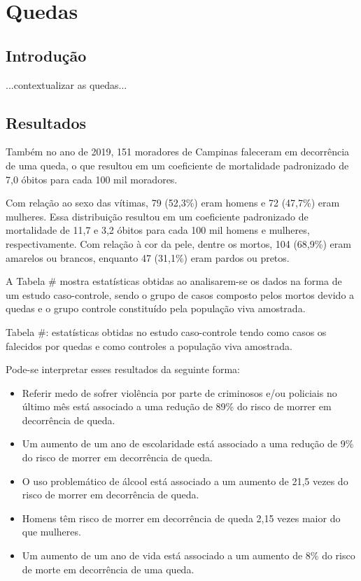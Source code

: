 \chapter{Quedas}

\section{Introdução}

...contextualizar as quedas...

\section{Resultados}

Também no ano de 2019, 151 moradores de Campinas faleceram em
decorrência de uma queda, o que resultou em um coeficiente de mortalidade padronizado de 7,0 óbitos para cada 100 mil moradores.

Com relação ao sexo das vítimas, 79 (52,3\%) eram homens e 72 (47,7\%) eram mulheres. Essa distribuição resultou em um coeficiente padronizado de mortalidade de 11,7 e 3,2 óbitos para cada 100 mil homens e mulheres, respectivamente. Com relação à cor da pele, dentre os mortos, 104 (68,9\%) eram amarelos ou brancos, enquanto 47 (31,1\%) eram pardos ou pretos.

A Tabela \# mostra estatísticas obtidas ao analisarem-se os dados na forma de um estudo caso-controle, sendo o grupo de casos composto pelos mortos devido a quedas e o grupo controle constituído pela população viva amostrada.

Tabela \#: estatísticas obtidas no estudo caso-controle tendo como casos os falecidos por quedas e como controles a população viva amostrada.

Pode-se interpretar esses resultados da seguinte forma:

\begin{itemize}
    \item Referir medo de sofrer violência por parte de criminosos e/ou policiais no último mês está associado a uma redução de 89\% do risco de morrer em decorrência de queda.
    \item Um aumento de um ano de escolaridade está associado a uma redução de 9\% do risco de morrer em decorrência de queda.
    \item O uso problemático de álcool está associado a um aumento de 21,5 vezes do risco de morrer em decorrência de queda.
    \item Homens têm risco de morrer em decorrência de queda 2,15 vezes maior do que mulheres.
    \item Um aumento de um ano de vida está associado a um aumento de 8\% do risco de morte em decorrência de uma queda.
\end{itemize}

